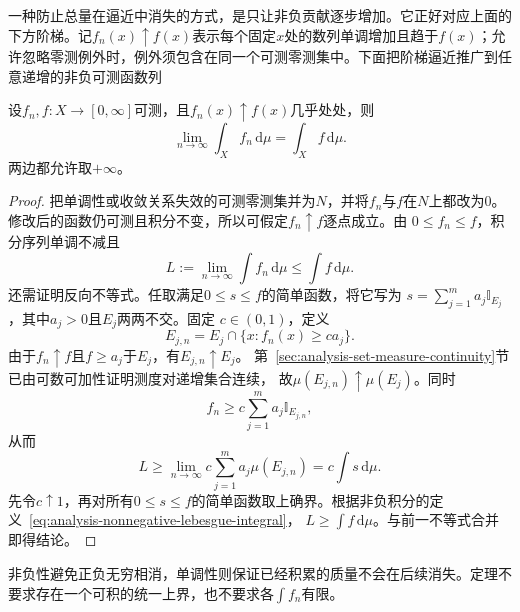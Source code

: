 一种防止总量在逼近中消失的方式，是只让非负贡献逐步增加。它正好对应上面的下方阶梯。记$f_n(x)\uparrow f(x)$表示每个固定$x$处的数列单调增加且趋于$f(x)$；允许忽略零测例外时，例外须包含在同一个可测零测集中。下面把阶梯逼近推广到任意递增的非负可测函数列
\begin{theorem}[单调收敛定理]
\label{thm:analysis-monotone-convergence}
设$f_n,f:X\to[0,\infty]$可测，且$f_n(x)\uparrow f(x)$几乎处处，则
\[   \lim_{n\to\infty}\int_X f_n\,\mathrm{d}\mu   =   \int_X f\,\mathrm{d}\mu. \]
两边都允许取$+\infty$。
\end{theorem}
\begin{proof}
把单调性或收敛关系失效的可测零测集并为$N$，并将$f_n$与$f$在$N$上都改为$0$。
修改后的函数仍可测且积分不变，所以可假定$f_n\uparrow f$逐点成立。由
$0\leq f_n\leq f$，积分序列单调不减且
\[   L:=\lim_{n\to\infty}\int f_n\,\mathrm{d}\mu   \leq\int f\,\mathrm{d}\mu. \]
还需证明反向不等式。任取满足$0\leq s\leq f$的简单函数，将它写为 $s=\sum_{j=1}^m a_j\mathbb{I}_{E_j}$，其中$a_j>0$且$E_j$两两不交。固定 $c\in(0,1)$，定义
\[   E_{j,n}   =   E_j\cap\{x:f_n(x)\geq ca_j\}. \]
由于$f_n\uparrow f$且$f\geq a_j$于$E_j$，有$E_{j,n}\uparrow E_j$。
第~\ref{sec:analysis-set-measure-continuity}节已由可数可加性证明测度对递增集合连续，
故$\mu(E_{j,n})\uparrow\mu(E_j)$。同时
\[   f_n   \geq   c\sum_{j=1}^m a_j\mathbb{I}_{E_{j,n}}, \]
从而
\[   L   \geq   \lim_{n\to\infty}   c\sum_{j=1}^m a_j\mu(E_{j,n})   =   c\int s\,\mathrm{d}\mu. \]
先令$c\uparrow1$，再对所有$0\leq s\leq f$的简单函数取上确界。根据非负积分的定义~\eqref{eq:analysis-nonnegative-lebesgue-integral}， $L\geq\int f\,\mathrm{d}\mu$。与前一不等式合并即得结论。
\end{proof}

非负性避免正负无穷相消，单调性则保证已经积累的质量不会在后续消失。定理不要求存在一个可积的统一上界，也不要求各$\int f_n$有限。

